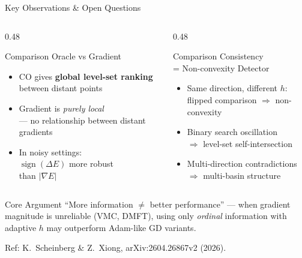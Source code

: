 \documentclass[10pt,aspectratio=169]{beamer}
\begin{document}
\begin{frame}{Key Observations \& Open Questions}
\begin{columns}[T]
\begin{column}{0.48\textwidth}
  \begin{block}{Comparison Oracle vs Gradient}
    \begin{itemize}
      \item CO gives \textbf{global level-set ranking}\\
            between distant points
      \item Gradient is \emph{purely local}\\
            — no relationship between distant gradients
      \item In noisy settings:\\
            $\operatorname{sign}(\Delta E)$ more robust\\
            than $|\nabla E|$
    \end{itemize}
  \end{block}
\end{column}
\begin{column}{0.48\textwidth}
  \begin{block}{Comparison Consistency\\= Non-convexity Detector}
    \begin{itemize}
      \item Same direction, different $h$:\\
            flipped comparison $\Rightarrow$ non-convexity
      \item Binary search oscillation\\
            $\Rightarrow$ level-set self-intersection
      \item Multi-direction contradictions\\
            $\Rightarrow$ multi-basin structure
    \end{itemize}
  \end{block}
\end{column}
\end{columns}

\vspace{4pt}
\begin{alertblock}{Core Argument}
``More information $\neq$ better performance'' — when gradient magnitude
is unreliable (VMC, DMFT), using only \emph{ordinal}
information with adaptive $h$ may outperform Adam-like GD variants.
\end{alertblock}

\vspace{2pt}
\footnotesize Ref: K.\ Scheinberg \& Z.\ Xiong, arXiv:2604.26867v2 (2026).
\end{frame}
\end{document}

